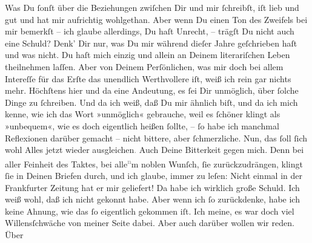 \pstart
           Was Du{ }ſonſt über die Beziehungen zwiſchen Dir und mir{ }ſchreibſt, iſt lieb und gut
               und hat mir aufrichtig wohlgethan. Aber wenn Du einen Ton des Zweifels bei {\pb}mir bemerkſt – ich glaube allerdings, Du haſt
               Unrecht, – trägſt Du nicht auch eine Schuld? Denk’ Dir nur, was Du mir während dieſer
               Jahre geſchrieben haſt und was nicht. Du haſt mich einzig und allein an Deinem
               literariſchen Leben theilnehmen laſſen. Aber von Deinem Perſönlichen, was mir doch
               bei allem Intereſſe für das Erſte das unendlich Werthvollere iſt, weiß ich rein gar
               nichts mehr. Höchſtens hier und da eine Andeutung, es{ }ſei Dir unmöglich, über{ }ſolche
               Dinge zu{ }ſchreiben. Und da ich weiß, daß Du mir ähnlich biſt, und da ich mich kenne,
               wie ich das Wort »unmöglich« gebrauche, weil es{ }ſchöner klingt als »unbequem«, {\pb}wie es doch eigentlich heißen{ }ſollte, –{ }ſo habe ich
               manchmal Reflexionen darüber gemacht – nicht bittere, aber{ }ſchmerzliche. Nun, das{ }ſoll{ }ſich wohl Alles jetzt wieder ausgleichen\textcolor{gray}{.} Auch Deine
               Bitterkeit gegen mich. Denn bei aller Feinheit des Taktes, bei alle\substVorne{}\textsuperscript{\textcolor{gray}{n}}\substDazwischen{}m\substHinten{} noblen Wunſch,{ }ſie zurückzudrängen, klingt{ }ſie in Deinen Briefen durch, und
               ich glaube, immer zu leſen: Nicht einmal \label{K_L02712-3v}\label{K_L02712-3} in der Frankfurter Zeitung hat er mir
               geliefert! Da habe ich wirklich große Schuld. Ich weiß wohl, daß ich nicht gekonnt
               habe. Aber wenn ich{ }ſo zurückdenke, habe ich keine Ahnung, wie das{ }ſo eigentlich {\pb}gekommen iſt. Ich meine, es war doch viel
               Willensſchwäche von meiner Seite dabei. Aber auch darüber wollen wir reden. Über
